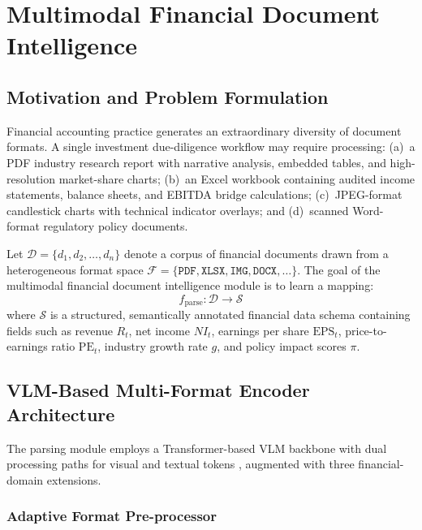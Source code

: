 \documentclass[12pt,letterpaper]{article}
\begin{document}
\section{Multimodal Financial Document Intelligence}
\label{sec:innovation1}

\subsection{Motivation and Problem Formulation}

Financial accounting practice generates an extraordinary diversity of
document formats.
A single investment due-diligence workflow may require processing:
(a)~a PDF industry research report with narrative analysis, embedded
tables, and high-resolution market-share charts;
(b)~an Excel workbook containing audited income statements, balance
sheets, and EBITDA bridge calculations;
(c)~JPEG-format candlestick charts with technical indicator overlays;
and (d)~scanned Word-format regulatory policy documents.

Let $\mathcal{D} = \{d_1, d_2, \ldots, d_n\}$ denote a corpus of
financial documents drawn from a heterogeneous format space
$\mathcal{F} = \{\texttt{PDF}, \texttt{XLSX}, \texttt{IMG},
\texttt{DOCX},\ldots\}$.
The goal of the multimodal financial document intelligence module is
to learn a mapping:
\begin{equation}
  f_{\text{parse}} : \mathcal{D} \rightarrow \mathcal{S}
  \label{eq:parse}
\end{equation}
where $\mathcal{S}$ is a structured, semantically annotated financial
data schema containing fields such as revenue $R_t$, net income
$NI_t$, earnings per share $\text{EPS}_t$, price-to-earnings ratio
$\text{PE}_t$, industry growth rate $g$, and policy impact scores
$\pi$.

\subsection{VLM-Based Multi-Format Encoder Architecture}

The parsing module employs a Transformer-based VLM backbone with dual
processing paths for visual and textual tokens \citep{li2023},
augmented with three financial-domain extensions.

\subsubsection{Adaptive Format Pre-processor}
\end{document}
